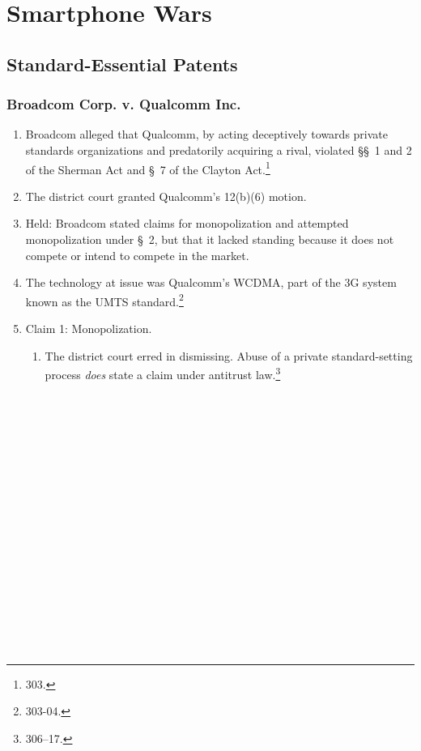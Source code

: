 \section{Smartphone Wars}

\subsection{Standard-Essential Patents}

\subsubsection{Broadcom Corp. v. Qualcomm Inc.}

\begin{enumerate}
    \item Broadcom alleged that Qualcomm, by acting deceptively towards private 
    standards organizations and predatorily acquiring a rival, violated \S\S\ 
    1 and 2 of the Sherman Act and \S\ 7 of the Clayton Act.\footnote{303.}
    \item The district court granted Qualcomm's 12(b)(6) motion.
    \item Held: Broadcom stated claims for monopolization and attempted 
    monopolization under \S\ 2, but that it lacked standing because it does 
    not compete or intend to compete in the market.
    \item The technology at issue was Qualcomm's WCDMA, part of the 3G system 
    known as the UMTS standard.\footnote{303-04.}
    \item Claim 1: Monopolization.
    \begin{enumerate}
        \item The district court erred in dismissing. Abuse of a private 
        standard-setting process \emph{does} state a claim under antitrust 
        law.\footnote{306--17.}
        ~\\\\\\\\\\\\\\\\\\\\\\\\\\\\\\\\\\\\

\end{enumerate}
\end{enumerate}
